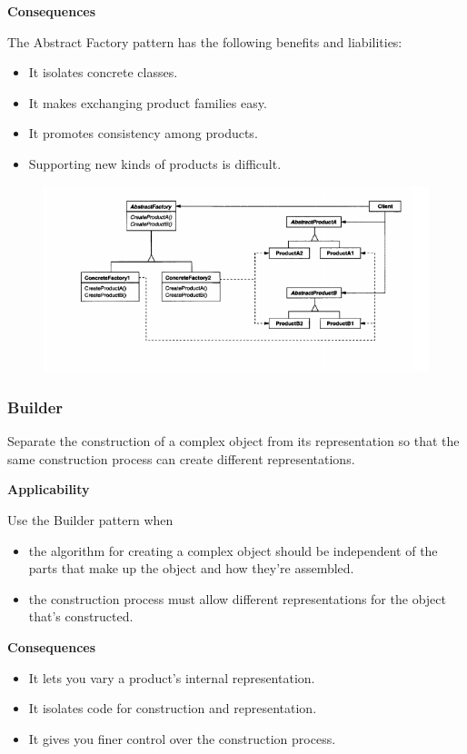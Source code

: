 \documentclass{article}
\begin{document}
\textbf{Consequences}

The Abstract Factory pattern has the following benefits and liabilities:
\begin{itemize}
    \item It isolates concrete classes.
    \item It makes exchanging product families easy.
    \item It promotes consistency among products.
    \item Supporting new kinds of products is difficult.
\end{itemize}

\begin{figure}[h]
    \centering
    \includegraphics[width=14cm]{diagrams/pattern-1-abstract-factory.png}
\end{figure}

\newpage
\subsubsection{Builder}
Separate the construction of a complex object from its representation so
that the same construction process can create different representations.


\textbf{Applicability}

Use the Builder pattern when
\begin{itemize}
    \item the algorithm for creating a complex object should be independent of the parts that make up the object and how they're assembled.
    \item the construction process must allow different representations for the object that's constructed.
\end{itemize}

\textbf{Consequences}
\begin{itemize}
    \item It lets you vary a product's internal representation.
    \item It isolates code for construction and representation.
    \item It gives you finer control over the construction process.
\end{itemize}
\end{document}
